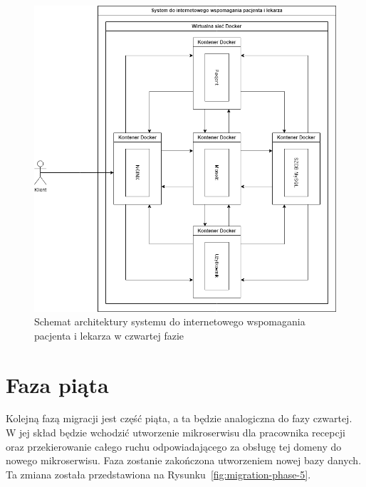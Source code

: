 \documentclass[12pt,twoside]{book}
\newcommand{\captionvspace}{\vspace{6pt}}
\begin{document}
\begin{figure}[ht]
\centering
\includegraphics[width=\textwidth]{includes/images/migration-phase-4.png}
\captionvspace
\caption{Schemat architektury systemu do internetowego wspomagania pacjenta i lekarza w czwartej fazie}
\label{fig:migration-phase-4}
\end{figure}

\section{Faza piąta}
Kolejną fazą migracji jest część piąta, a ta będzie analogiczna do fazy czwartej. W jej skład będzie wchodzić utworzenie mikroserwisu dla pracownika recepcji oraz przekierowanie całego ruchu odpowiadającego za obsługę tej domeny do nowego mikroserwisu. Faza zostanie zakończona utworzeniem nowej bazy danych. Ta zmiana została przedstawiona na Rysunku~\ref{fig:migration-phase-5}.
\end{document}

